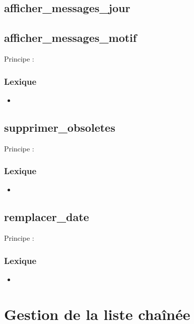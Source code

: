   \subsection{afficher\_messages\_jour}
    \begin{algo}[informal]
      \BEGIN
      \END
    \end{algo}        
          
  \subsection{afficher\_messages\_motif}
    Principe :
  
    \subsubsection{Lexique}
      \begin{itemize}
        \item 
      \end{itemize}

  \subsection{supprimer\_obsoletes}
    Principe :

    \subsubsection{Lexique}
      \begin{itemize}
        \item 
      \end{itemize}

  \subsection{remplacer\_date}
    Principe :

    \subsubsection{Lexique}
      \begin{itemize}
        \item 
      \end{itemize}      

\section{Gestion de la liste chaînée}